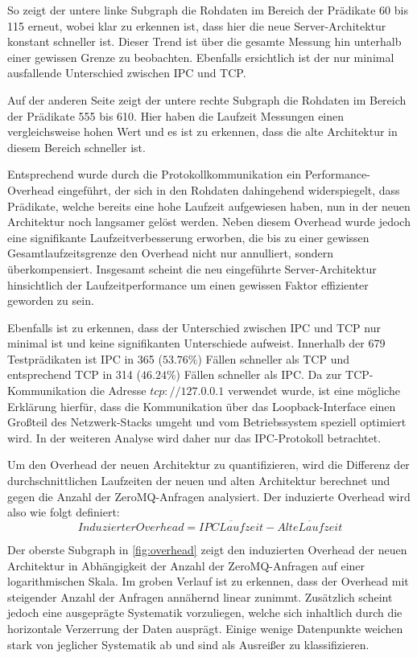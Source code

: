 So zeigt der untere linke Subgraph die Rohdaten im Bereich der Prädikate 60 bis 115 erneut,
wobei klar zu erkennen ist, dass hier die neue Server-Architektur konstant schneller ist.
Dieser Trend ist über die gesamte Messung hin unterhalb einer gewissen Grenze zu beobachten.
Ebenfalls ersichtlich ist der nur minimal ausfallende Unterschied zwischen IPC und TCP.

Auf der anderen Seite zeigt der untere rechte Subgraph die Rohdaten im Bereich der Prädikate 555 bis 610.
Hier haben die Laufzeit Messungen einen vergleichsweise hohen Wert und es ist zu erkennen,
dass die alte Architektur in diesem Bereich schneller ist. 

Entsprechend wurde durch die Protokollkommunikation ein Performance-Overhead eingeführt, der sich in den Rohdaten dahingehend widerspiegelt,
dass Prädikate, welche bereits eine hohe Laufzeit aufgewiesen haben, nun in der neuen Architektur noch langsamer gelöst werden.
Neben diesem Overhead wurde jedoch eine signifikante Laufzeitverbesserung erworben, die bis zu einer gewissen Gesamtlaufzeitsgrenze den
Overhead nicht nur annulliert, sondern überkompensiert.
Insgesamt scheint die neu eingeführte Server-Architektur hinsichtlich der Laufzeitperformance um einen gewissen Faktor effizienter geworden zu sein.

Ebenfalls ist zu erkennen, dass der Unterschied zwischen IPC und TCP nur minimal ist und keine signifikanten Unterschiede aufweist.
Innerhalb der 679 Testprädikaten ist IPC in 365 ($53.76\%$) Fällen schneller als TCP und entsprechend TCP in 314 ($46.24\%$) Fällen schneller als IPC.
Da zur TCP-Kommunikation die Adresse  $tcp://127.0.0.1$ verwendet wurde, ist eine mögliche Erklärung hierfür, dass die Kommunikation über das Loopback-Interface
einen Großteil des Netzwerk-Stacks umgeht und vom Betriebssystem speziell optimiert wird.
In der weiteren Analyse wird daher nur das IPC-Protokoll betrachtet.

\clearpage

Um den Overhead der neuen Architektur zu quantifizieren,
wird die Differenz der durchschnittlichen Laufzeiten der neuen und alten Architektur berechnet
und gegen die Anzahl der ZeroMQ-Anfragen analysiert.
Der induzierte Overhead wird also wie folgt definiert:
\begin{equation}
    InduzierterOverhead = \overline{IPC Laufzeit} - \overline{Alte Laufzeit}
\end{equation}

Der oberste Subgraph in \cref{fig:overhead} zeigt den induzierten Overhead der neuen Architektur in Abhängigkeit der Anzahl der ZeroMQ-Anfragen auf einer logarithmischen Skala.
Im groben Verlauf ist zu erkennen, dass der Overhead mit steigender Anzahl der Anfragen annähernd linear zunimmt.
Zusätzlich scheint jedoch eine ausgeprägte Systematik vorzuliegen, welche sich inhaltlich durch die horizontale Verzerrung der Daten ausprägt.
Einige wenige Datenpunkte weichen stark von jeglicher Systematik ab und sind als Ausreißer zu klassifizieren.

